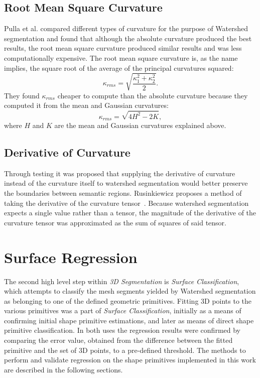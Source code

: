 \subsection{Root Mean Square Curvature}
Pulla et al. compared different types of curvature for the purpose of Watershed segmentation and found that although the absolute curvature produced the best results, the root mean square curvature produced similar results and was less computationally expensive.
The root mean square curvature is, as the name implies, the square root of the average of the principal curvatures squared:
\begin{equation*}
	\kappa_{rms} = \sqrt{\frac{\kappa_1^2 + \kappa_2^2}{2}}.
\end{equation*}
They found $\kappa_{rms}$ cheaper to compute than the absolute curvature because they computed it from the mean and Gaussian curvatures:
\begin{equation*}
	\kappa_{rms} = \sqrt{4H^2 - 2K},
\end{equation*}
where $H$ and $K$ are the mean and Gaussian curvatures explained above.

\subsection{Derivative of Curvature}
Through testing it was proposed that supplying the derivative of curvature instead of the curvature itself to watershed segmentation would better preserve the boundaries between semantic regions.
Rusinkiewicz proposes a method of taking the derivative of the curvature tensor~\cite{SRTensor}.
Because watershed segmentation expects a single value rather than a tensor, the magnitude of the derivative of the curvature tensor was approximated as the sum of squares of said tensor.

\section{Surface Regression}
The second high level step within \textit{3D Segmentation} is \textit{Surface Classification}, which attempts to classify the mesh segments yielded by Watershed segmentation as belonging to one of the defined geometric primitives.
Fitting 3D points to the various primitives was a part of \textit{Surface Classification}, initially as a means of confirming initial shape primitive estimations, and later as means of direct shape primitive classification.
In both uses the regression results were confirmed by comparing the error value, obtained from the difference between the fitted primitive and the set of 3D points, to a pre-defined threshold.
The methods to perform and validate regression on the shape primitives implemented in this work are described in the following sections.

